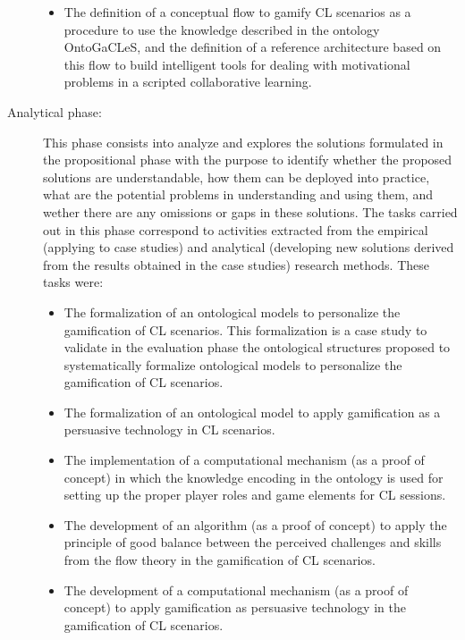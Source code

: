 \begin{description}
\begin{itemize}
\item
The definition of a conceptual flow to gamify CL scenarios as a procedure to use the knowledge described in the ontology OntoGaCLeS, and
the definition of a reference architecture based on this flow to build intelligent tools for dealing with motivational problems in a scripted collaborative learning.
\end{itemize}

\item[Analytical phase:]
This phase consists into analyze and explores the solutions formulated in the propositional phase with the purpose to identify whether the proposed solutions are understandable, how them can be deployed into practice, what are the potential problems in understanding and using them, and wether there are any omissions or gaps in these solutions.
The tasks carried out in this phase correspond to activities extracted from the empirical (applying to case studies) and analytical (developing new solutions derived from the results obtained in the case studies) research methods.
These tasks were:

\begin{itemize}
\item
The formalization of an ontological models to personalize the gamification of CL scenarios.
This formalization is a case study to validate in the evaluation phase the ontological structures proposed to systematically formalize ontological models to personalize the gamification of CL scenarios.

\item
The formalization of an ontological model to apply gamification as a persuasive technology in CL scenarios.

\item
The implementation of a computational mechanism (as a proof of concept) in which the knowledge encoding in the ontology is used for setting up the proper player roles and game elements for CL sessions.

\item
The development of an algorithm (as a proof of concept) to apply the principle of good balance between the perceived challenges and skills from the flow theory in the gamification of CL scenarios.

\item
The development of a computational mechanism (as a proof of concept) to apply gamification as persuasive technology in the gamification of CL scenarios.
\end{itemize}



\end{description}
